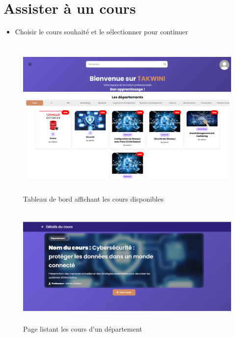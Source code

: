 \documentclass{article}
\begin{document}
\section*{Assister à un cours}
\begin{itemize}
    \item Choisir le cours souhaité et le sélectionner pour continuer
\end{itemize}
\begin{figure}[H]
  \centering
  \includegraphics[height=8cm]{DASHBOARD.png}
  \caption{Tableau de bord affichant les cours disponibles}
  \label{fig:dashboard}
\end{figure}

\begin{figure}[H]
  \centering
  \includegraphics[height=6cm]{COURS.jpg}
  \caption{Page listant les cours d’un département}
  \label{fig:cours}
\end{figure}
\end{document}
